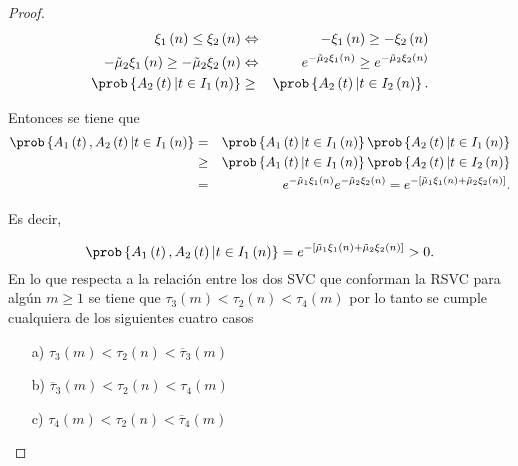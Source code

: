 \begin{proof}
\begin{eqnarray*}
\xi_{1}\left(n\right)\leq\xi_{2}\left(n\right)&\Leftrightarrow& -\xi_{1}\left(n\right)\geq-\xi_{2}\left(n\right)
\\
-\tilde{\mu}_{2}\xi_{1}\left(n\right)\geq-\tilde{\mu}_{2}\xi_{2}\left(n\right)&\Leftrightarrow&
e^{-\tilde{\mu}_{2}\xi_{1}\left(n\right)}\geq e^{-\tilde{\mu}_{2}\xi_{2}\left(n\right)}\\
\prob\left\{A_{2}\left(t\right)|t\in I_{1}\left(n\right)\right\}&\geq&
\prob\left\{A_{2}\left(t\right)|t\in I_{2}\left(n\right)\right\}.
\end{eqnarray*}


Entonces se tiene que
\small{
\begin{eqnarray*}
\prob\left\{A_{1}\left(t\right),A_{2}\left(t\right)|t\in I_{1}\left(n\right)\right\}&=&
\prob\left\{A_{1}\left(t\right)|t\in I_{1}\left(n\right)\right\}
\prob\left\{A_{2}\left(t\right)|t\in I_{1}\left(n\right)\right\}\\
&\geq&
\prob\left\{A_{1}\left(t\right)|t\in I_{1}\left(n\right)\right\}
\prob\left\{A_{2}\left(t\right)|t\in I_{2}\left(n\right)\right\}\\
&=&e^{-\tilde{\mu}_{1}\xi_{1}\left(n\right)}e^{-\tilde{\mu}_{2}\xi_{2}\left(n\right)}
=e^{-\left[\tilde{\mu}_{1}\xi_{1}\left(n\right)+\tilde{\mu}_{2}\xi_{2}\left(n\right)\right]}.
\end{eqnarray*}}


Es decir, 

\begin{equation}
\prob\left\{A_{1}\left(t\right),A_{2}\left(t\right)|t\in I_{1}\left(n\right)\right\}
=e^{-\left[\tilde{\mu}_{1}\xi_{1}\left(n\right)+\tilde{\mu}_{2}\xi_{2}
\left(n\right)\right]}>0.
\end{equation}
En lo que respecta a la relaci\'on entre los dos SVC que conforman la RSVC para alg\'un $m\geq1$ se tiene que $\tau_{3}\left(m\right)<\tau_{2}\left(n\right)<\tau_{4}\left(m\right)$ por lo tanto se cumple cualquiera de los siguientes cuatro casos
\begin{itemize}
\item[a)] $\tau_{3}\left(m\right)<\tau_{2}\left(n\right)<\overline{\tau}_{3}\left(m\right)$

\item[b)] $\overline{\tau}_{3}\left(m\right)<\tau_{2}\left(n\right)
<\tau_{4}\left(m\right)$

\item[c)] $\tau_{4}\left(m\right)<\tau_{2}\left(n\right)<
\overline{\tau}_{4}\left(m\right)$


\end{itemize}
\end{proof}
